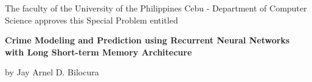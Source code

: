 \begin{approval}
    \par The faculty of the University of the Philippines Cebu - Department of Computer Science approves this Special Problem entitled
    \vspace{1in}
    \par\textbf{Crime Modeling and Prediction using Recurrent Neural Networks with Long Short-term Memory Architecure}
    \vspace{1in}
    \par by Jay Arnel D. Bilocura
    \vspace{1in}

    \par\noindent\makebox[2.5in]{\hrulefill}
    \hfill\makebox[2.5in]{\hrulefill}

    \par\noindent{}
    \hfill{}

    \par\noindent{}
    \hfill{}

    \vspace{1in}

    \par\noindent\makebox[2.5in]{\hrulefill}
    \hfill\makebox[2.5in]{\hrulefill}

    \par\noindent{}
    \hfill{}
\end{approval}